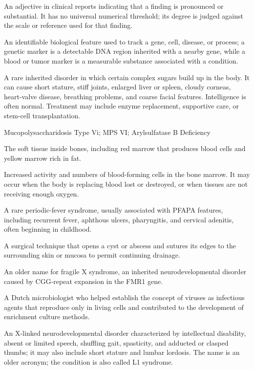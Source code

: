  An adjective in clinical reports indicating that a finding is pronounced or substantial. It has no universal numerical threshold; its degree is judged against the scale or reference used for that finding.

 An identifiable biological feature used to track a gene, cell, disease, or process; a genetic marker is a detectable DNA region inherited with a nearby gene, while a blood or tumor marker is a measurable substance associated with a condition.

 A rare inherited disorder in which certain complex sugars build up in the body. It can cause short stature, stiff joints, enlarged liver or spleen, cloudy corneas, heart-valve disease, breathing problems, and coarse facial features. Intelligence is often normal. Treatment may include enzyme replacement, supportive care, or stem-cell transplantation.

\synonyms
Mucopolysaccharidosis Type Vi; MPS VI; Arylsulfatase B Deficiency

 The soft tissue inside bones, including red marrow that produces blood cells and yellow marrow rich in fat.

 Increased activity and numbers of blood-forming cells in the bone marrow. It may occur when the body is replacing blood lost or destroyed, or when tissues are not receiving enough oxygen.

 A rare periodic-fever syndrome, usually associated with PFAPA features, including recurrent fever, aphthous ulcers, pharyngitis, and cervical adenitis, often beginning in childhood.

 A surgical technique that opens a cyst or abscess and sutures its edges to the surrounding skin or mucosa to permit continuing drainage.

 An older name for fragile X syndrome, an inherited neurodevelopmental disorder caused by CGG-repeat expansion in the FMR1 gene.

 A Dutch microbiologist who helped establish the concept of viruses as infectious agents that reproduce only in living cells and contributed to the development of enrichment culture methods.

 An X-linked neurodevelopmental disorder characterized by intellectual disability, absent or limited speech, shuffling gait, spasticity, and adducted or clasped thumbs; it may also include short stature and lumbar lordosis. The name is an older acronym; the condition is also called L1 syndrome.

